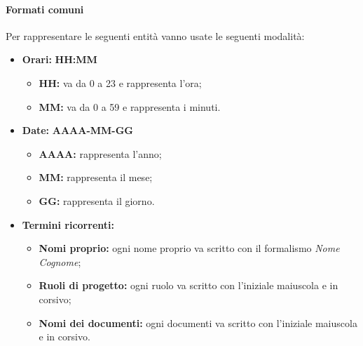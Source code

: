 		\paragraph{Formati comuni}
		Per rappresentare le seguenti entità vanno usate le seguenti modalità:
		\begin{itemize}
			
			\item \textbf{Orari:}
			\textbf{HH:MM}
				\begin{itemize}
					\item \textbf{HH:} va da 0 a 23 e rappresenta l'ora;
					\item \textbf{MM:} va da 0 a 59 e rappresenta i minuti.
				\end{itemize}
			
			\item \textbf{Date:}
			\textbf{AAAA-MM-GG}
				\begin{itemize}
					\item \textbf{AAAA:} rappresenta l'anno;
					\item \textbf{MM:} rappresenta il mese;
					\item \textbf{GG:} rappresenta il giorno.
				\end{itemize}
			
			\item \textbf{Termini ricorrenti:}
			\begin{itemize}
				\item \textbf{Nomi proprio:} ogni nome proprio va scritto con il formalismo \textit{Nome Cognome};
				\item \textbf{Ruoli di progetto:} ogni ruolo va scritto con l'iniziale maiuscola e in corsivo;
				\item \textbf{Nomi dei documenti:} ogni documenti va scritto con l'iniziale maiuscola e in corsivo.
			\end{itemize}
			
		\end{itemize}
		

